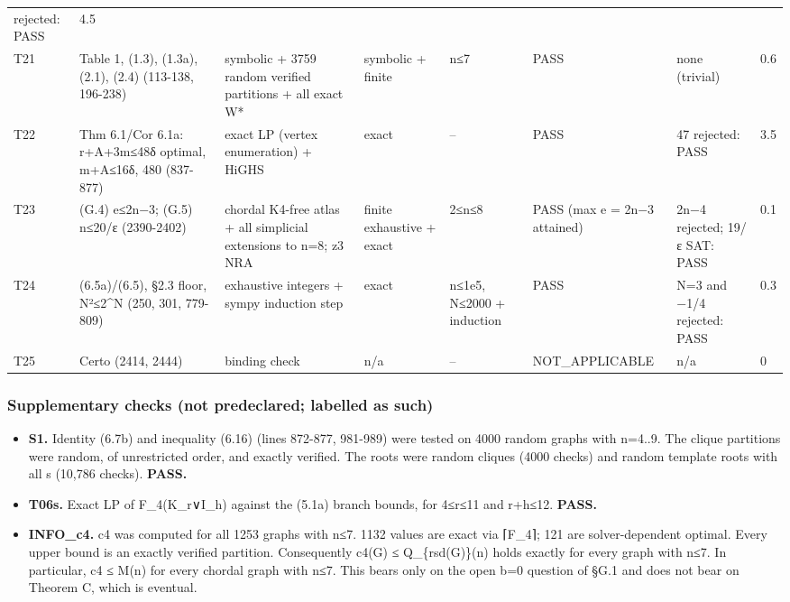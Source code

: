 \documentclass[
]{article}
\newcounter{none} %
\providecommand{\tightlist}{%
  \setlength{\itemsep}{0pt}\setlength{\parskip}{0pt}}
\begin{document}
{\begin{longtable}[]{@{}llllllll@{}}
rejected: PASS & 4.5 \\
T21 & Table 1, (1.3), (1.3a), (2.1), (2.4) (113-138, 196-238) & symbolic
+ 3759 random verified partitions + all exact W* & symbolic + finite &
n≤7 & PASS & none (trivial) & 0.6 \\
T22 & Thm 6.1/Cor 6.1a: r+A+3m≤48δ optimal, m+A≤16δ, 480 (837-877) &
exact LP (vertex enumeration) + HiGHS & exact & -- & PASS & 47 rejected:
PASS & 3.5 \\
T23 & (G.4) e≤2n−3; (G.5) n≤20/ε (2390-2402) & chordal K4-free atlas +
all simplicial extensions to n=8; z3 NRA & finite exhaustive + exact &
2≤n≤8 & PASS (max e = 2n−3 attained) & 2n−4 rejected; 19/ε SAT: PASS &
0.1 \\
T24 & (6.5a)/(6.5), §2.3 floor, N²≤2\^{}N (250, 301, 779-809) &
exhaustive integers + sympy induction step & exact & n≤1e5, N≤2000 +
induction & PASS & N=3 and −1/4 rejected: PASS & 0.3 \\
T25 & Certo (2414, 2444) & binding check & n/a & -- & NOT\_APPLICABLE &
n/a & 0 \\
\end{longtable}
}

\subsubsection{Supplementary checks (not predeclared; labelled as
such)}\label{supplementary-checks-not-predeclared-labelled-as-such}

\begin{itemize}
\tightlist
\item
  \textbf{S1.} Identity (6.7b) and inequality (6.16) (lines 872-877,
  981-989) were tested on 4000 random graphs with n=4..9. The clique
  partitions were random, of unrestricted order, and exactly verified.
  The roots were random cliques (4000 checks) and random template roots
  with all s (10,786 checks). \textbf{PASS.}
\item
  \textbf{T06s.} Exact LP of F\_4(K\_r∨I\_h) against the (5.1a) branch
  bounds, for 4≤r≤11 and r+h≤12. \textbf{PASS.}
\item
  \textbf{INFO\_c4.} c4 was computed for all 1253 graphs with n≤7. 1132
  values are exact via ⌈F\_4⌉; 121 are solver-dependent optimal. Every
  upper bound is an exactly verified partition. Consequently c4(G) ≤
  Q\_\{rsd(G)\}(n) holds exactly for every graph with n≤7. In
  particular, c4 ≤ M(n) for every chordal graph with n≤7. This bears
  only on the open b=0 question of §G.1 and does not bear on Theorem C,
  which is eventual.
\end{itemize}
\end{document}
